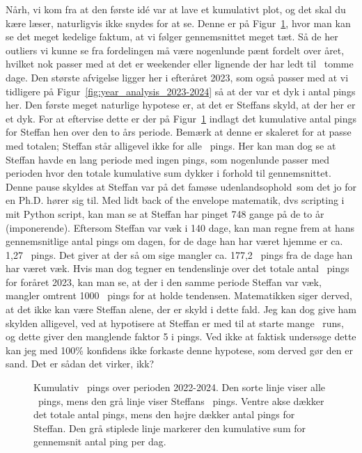 \begin{article}
Nårh, vi kom fra at den første idé var at lave et kumulativt plot, og det skal du kære læser, naturligvis ikke snydes for at se. Denne er på Figur~\ref{fig:double_cummulative_sum_vs_average_with_Steffan}, hvor man kan se det meget kedelige faktum, at vi følger gennemsnittet meget tæt. Så de her outliers vi kunne se fra fordelingen må være nogenlunde pænt fordelt over året, hvilket nok passer med at det er weekender eller lignende der har ledt til \coffee\ tomme dage.
Den største afvigelse ligger her i efteråret 2023, som også passer med at vi tidligere på Figur~\ref{fig:year_analysis_2023-2024} så at der var et dyk i antal pings her.
Den første meget naturlige hypotese er, at det er Steffans skyld, at der her er et dyk. For at eftervise dette er der på Figur~\ref{fig:double_cummulative_sum_vs_average_with_Steffan} indlagt det kumulative antal pings for Steffan hen over den to års periode. Bemærk at denne er skaleret for at passe med totalen; Steffan står alligevel ikke for alle \coffee\ pings.
Her kan man dog se at Steffan havde en lang periode med ingen pings, som nogenlunde passer med perioden hvor den totale kumulative sum dykker i forhold til gennemsnittet. Denne pause skyldes at Steffan var på det famøse udenlandsophold\texttrademark\ som det jo for en Ph.D. hører sig til. Med lidt back of the envelope matematik, dvs scripting i mit Python script, kan man se at Steffan har pinget 748 gange på de to år (imponerende). Eftersom Steffan var væk i 140 dage, kan man regne frem at hans gennemsnitlige antal pings om dagen, for de dage han har været hjemme er ca. 1,27 \coffee\ pings. Det giver at der så om sige mangler ca. 177,2 \coffee\ pings fra de dage han har været væk.
Hvis man dog tegner en tendenslinje over det totale antal \coffee\ pings for foråret 2023, kan man se, at der i den samme periode Steffan var væk, mangler omtrent 1000 \coffee\ pings for at holde tendensen.
Matematikken siger derved, at det ikke kan være Steffan alene, der er skyld i dette fald. Jeg kan dog give ham skylden alligevel, ved at hypotisere at Steffan er med til at starte mange \coffee\ runs, og dette giver den manglende faktor 5 i pings. Ved ikke at faktisk undersøge dette kan jeg med 100\% konfidens ikke forkaste denne hypotese, som derved gør den er sand. Det er sådan det virker, ikk?

\begin{figure}[H]
	\centering
	\resizebox{\linewidth}{!}{}
	\vspace{-25pt}
	\caption{Kumulativ \protect\coffee\ pings over perioden 2022-2024. Den sorte linje viser alle \protect\coffee\ pings, mens den grå linje viser Steffans \protect\coffee\ pings. Ventre akse dækker det totale antal pings, mens den højre dækker antal pings for Steffan. Den grå stiplede linje markerer den kumulative sum for gennemsnit antal ping per dag.}
	\label{fig:double_cummulative_sum_vs_average_with_Steffan}
\end{figure}



\end{article}
